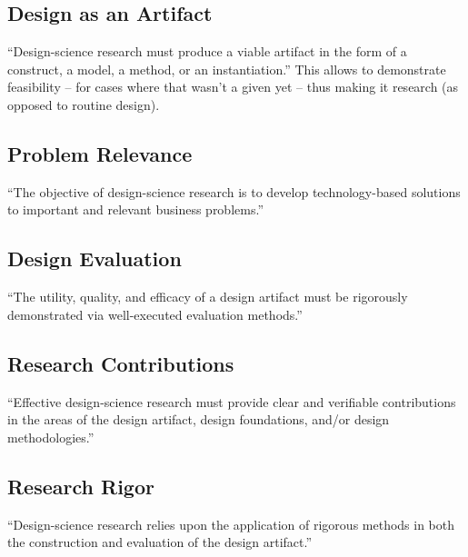 
\subsection{Design as an Artifact}
``Design-science research must produce a viable artifact in the form of a construct, a model, a method, or an instantiation.'' This allows to demonstrate feasibility -- for cases where that wasn't a given yet -- thus making it research (as opposed to routine design).


\subsection{Problem Relevance}
``The objective of design-science research is to develop technology-based solutions to important and relevant business problems.'' 


\subsection{Design Evaluation}
``The utility, quality, and efficacy of a design artifact must be rigorously demonstrated via well-executed evaluation methods.'' 

\subsection{Research Contributions}
``Effective design-science research must provide clear and verifiable contributions in the areas of the design artifact, design foundations, and/or design methodologies.'' 

\subsection{Research Rigor}
``Design-science research relies upon the application of rigorous methods in both the construction and evaluation of the design artifact.'' 

